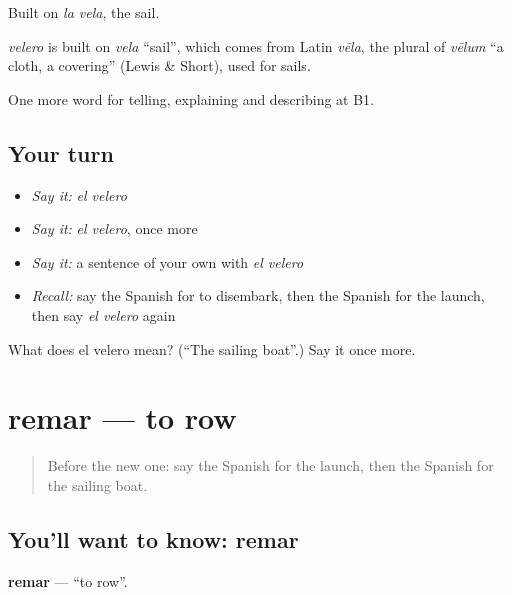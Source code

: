 Built on \emph{la vela}, the sail.

\begin{cousinweb}
\emph{velero} is built on \emph{vela} \textquotedblleft{}sail\textquotedblright{}, which comes from Latin \emph{vēla}, the plural of \emph{vēlum} \textquotedblleft{}a cloth, a covering\textquotedblright{} (Lewis \& Short), used for sails.
\end{cousinweb}

\begin{grammarlens}[title={What you've built}]
One more word for telling, explaining and describing at B1.
\end{grammarlens}

\subsection*{Your turn}
\begin{itemize}
\raggedright
  \item \emph{Say it:} \emph{el velero}
  \item \emph{Say it:} \emph{el velero}, once more
  \item \emph{Say it:} a sentence of your own with \emph{el velero}
  \item \emph{Recall:} say the Spanish for to disembark, then the Spanish for the launch, then say \emph{el velero} again
\end{itemize}

\begin{tcolorbox}[breakable,colback=teal!4,colframe=teal!35!black,title={Before you move on}]
What does el velero mean? (\textquotedblleft{}The sailing boat\textquotedblright{}.) Say it once more.
\end{tcolorbox}
\section[remar]{remar — to row}

\label{lesson:ES-C659-remar}



\begin{quote}
Before the new one: say the Spanish for the launch, then the Spanish for the sailing boat.
\end{quote}

\subsection*{You'll want to know: remar}
\textbf{remar} — \textquotedblleft{}to row\textquotedblright{}.

